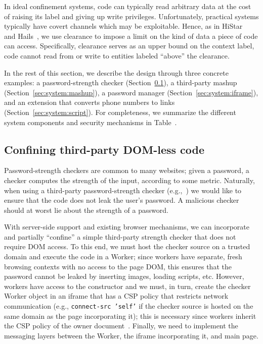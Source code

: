 In ideal confinement systems, code can typically read arbitrary data
at the cost of raising its label and giving up write privileges.
%
Unfortunately, practical systems typically have covert channels which
may be exploitable.
%
Hence, as in HiStar~ and Hails~,
we use clearance to impose a limit on the kind of data a piece of code
can access.
%
Specifically, clearance serves as an upper bound on the context label,
code cannot read from or write to entities labeled ``above'' the
clearance.

In the rest of this section, we describe the \sys{} design through
three concrete examples: a password-strength checker
(Section~\ref{sec:system:worker}), a third-party mashup
(Section~\ref{sec:system:mashup}), a
password manager (Section~\ref{sec:system:iframe}), and an extension
that converts phone numbers to links
(Section~\ref{sec:system:script}).
%
For completeness, we summarize the different system components and
security mechanisms in Table~.



\subsection{Confining third-party DOM-less code}
\label{sec:system:worker}

Password-strength checkers are common to many websites;
%
given a password, a checker computes the strength of the input,
according to some metric.
%
Naturally, when using a third-party password-strength checker
(e.g.,~) we would like to ensure that the
code does not leak the user's password.
%
A malicious checker should at worst lie about the strength of a
password.

With server-side support and existing browser mechanisms, we can
incorporate and partially ``confine'' a simple third-party strength
checker that does not require DOM access.
%
To this end, we must host the checker source on a trusted domain and
execute the code in a Worker; since workers have separate, fresh
browsing contexts with no access to the page DOM, this ensures that
the password cannot be leaked by inserting images, loading scripts,
etc.
%
However, workers have access to the \xhr{} constructor and we must, in
turn, create the checker Worker object in an iframe that has a CSP
policy that restricts network communication (e.g., \texttt{connect-src
'self'} if the checker source is hosted on the same domain as the page
incorporating it); this is necessary since workers inherit the CSP
policy of the owner document~.
%
Finally, we need to implement the messaging layers between the Worker,
the iframe incorporating it, and main page.

